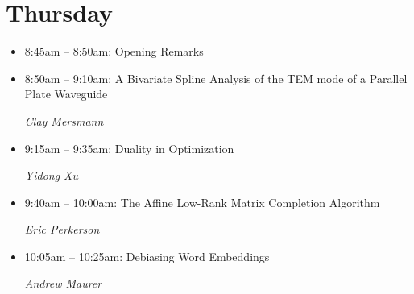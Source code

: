 \documentclass[oneside]{amsart}
\begin{document}


\section*{\textbf{Thursday}}

\begin{itemize}
\setlength\itemsep{1em}

\item 8:45am -- 8:50am: Opening Remarks
\item 8:50am -- 9:10am: A Bivariate Spline Analysis of the TEM mode of a Parallel Plate Waveguide \\ \vspace{-1.5em} \begin{flushright}\textit{ Clay Mersmann }\end{flushright}
\item 9:15am -- 9:35am: Duality in Optimization \\ \vspace{-1.5em} \begin{flushright}\textit{ Yidong Xu }\end{flushright}
\item 9:40am -- 10:00am: The Affine Low-Rank Matrix Completion Algorithm \\ \vspace{-1.5em} \begin{flushright}\textit{ Eric Perkerson }\end{flushright}
\item 10:05am -- 10:25am: Debiasing Word Embeddings \\ \vspace{-1.5em} \begin{flushright}\textit{ Andrew Maurer }\end{flushright}

\end{itemize}
\end{document}
